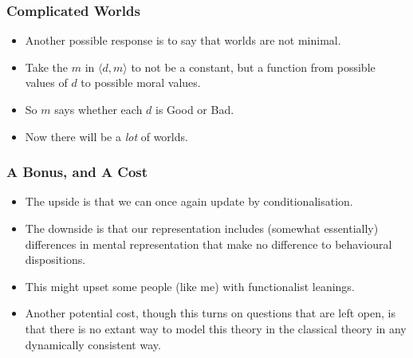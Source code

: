 \begin{frame}[fragile]
\frametitle{Complicated Worlds}
\label{complicatedworlds}

\begin{itemize}
\item{} Another possible response is to say that worlds are not minimal.

\item{} Take the $m$ in $\langle d, m\rangle$ to not be a constant, but a function from possible values of $d$ to possible moral values.

\item{} So $m$ says whether each $d$ is Good or Bad.

\item{} Now there will be a \emph{lot} of worlds.

\end{itemize}

\end{frame}

\begin{frame}[fragile]
\frametitle{A Bonus, and A Cost}
\label{abonusandacost}

\begin{itemize}
\item{} The upside is that we can once again update by conditionalisation.

\item{} The downside is that our representation includes (somewhat essentially) differences in mental representation that make no difference to behavioural dispositions.

\item{} This might upset some people (like me) with functionalist leanings.

\item{} Another potential cost, though this turns on questions that are left open, is that there is no extant way to model this theory in the classical theory in any dynamically consistent way.

\end{itemize}

\end{frame}

